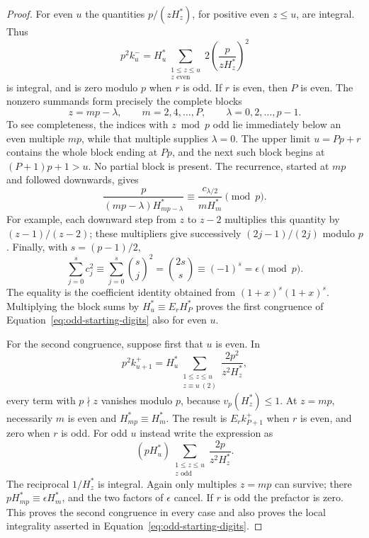 \begin{proof}
For even $u$ the quantities $p/(zH_z^*)$, for positive even $z\le u$,
are integral.  Thus
\[
 p^2k^-_u=H_u^*
     \sum_{\substack{1\le z\le u\\z\text{ even}}}
                  2\left(\frac{p}{zH_z^*}\right)^2
\]
is integral, and is zero modulo $p$ when $r$ is odd.  If $r$ is even,
then $P$ is even.  The nonzero summands form precisely the complete
blocks
\[
 z=mp-\lambda,\qquad
 m=2,4,\ldots,P,\qquad \lambda=0,2,\ldots,p-1.
\]
To see completeness, the indices with $z\bmod p$ odd lie immediately
below an even multiple $mp$, while that multiple supplies $\lambda=0$.
The upper limit $u=Pp+r$ contains the whole block ending at $Pp$,
and the next such block begins at $(P+1)p+1>u$.  No partial block is
present.  The recurrence, started at $mp$ and followed downwards, gives
\[
 \frac{p}{(mp-\lambda)H_{mp-\lambda}^*}
       \equiv\frac{c_{\lambda/2}}{mH_m^*}\pmod p.
\]
For example, each downward step from $z$ to $z-2$ multiplies this
quantity by $(z-1)/(z-2)$; these multipliers give successively
$(2j-1)/(2j)$ modulo $p$.  Finally, with $s=(p-1)/2$,
\[
 \sum_{j=0}^{s}c_j^2
  \equiv\sum_{j=0}^{s}\binom{s}{j}^2
  =\binom{2s}{s}\equiv(-1)^s=\epsilon\pmod p.
\]
The equality is the coefficient identity obtained from
$(1+x)^s(1+x)^s$.  Multiplying the block sums by
$H_u^*\equiv E_rH_P^*$ proves the first congruence of
Equation~\eqref{eq:odd-starting-digits} also for even $u$.

For the second congruence, suppose first that $u$ is even.  In
\[
 p^2k^+_{u+1}
   =H_u^*\sum_{\substack{1\le z\le u\\z\equiv u\ (2)}}
                     \frac{2p^2}{z^2H_z^*},
\]
every term with $p\nmid z$ vanishes modulo $p$, because
$v_p(H_z^*)\le1$.  At $z=mp$, necessarily $m$ is even and
$H_{mp}^*\equiv H_m^*$.  The result is $E_r k^+_{P+1}$ when $r$ is
even, and zero when $r$ is odd.  For odd $u$ instead write the expression
as
\[
 (pH_u^*)\sum_{\substack{1\le z\le u\\z\text{ odd}}}
                         \frac{2p}{z^2H_z^*}.
\]
The reciprocal $1/H_z^*$ is integral.  Again only multiples $z=mp$
can survive; there
$pH_{mp}^*\equiv\epsilon H_m^*$, and the two factors of $\epsilon$
cancel.  If $r$ is odd the prefactor is zero.  This proves the second
congruence in every case and also proves the local integrality asserted
in Equation~\eqref{eq:odd-starting-digits}.


\end{proof}
